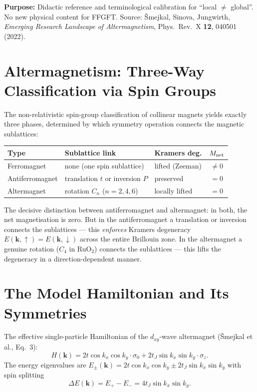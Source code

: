 \textbf{Purpose:} Didactic reference and terminological calibration
for \enquote{local $\neq$ global}. No new physical content for FFGFT.
Source: Šmejkal, Sinova, Jungwirth,
\textit{Emerging Research Landscape of Altermagnetism},
Phys.\ Rev.\ X \textbf{12}, 040501 (2022).

\section{Altermagnetism: Three-Way Classification via Spin Groups \E}

The non-relativistic spin-group classification of collinear magnets
yields exactly three phases, determined by which symmetry operation
connects the magnetic sublattices:

\begin{center}
\begin{tabular}{lllc}
\toprule
\textbf{Type} & \textbf{Sublattice link} & \textbf{Kramers deg.} & $M_{\rm net}$\\
\midrule
Ferromagnet     & none (one spin sublattice)         & lifted (Zeeman)   & $\neq 0$\\
Antiferromagnet & translation $t$ or inversion $P$   & preserved         & $= 0$\\
Altermagnet     & rotation $C_n$ ($n=2,4,6$)         & locally lifted    & $= 0$\\
\bottomrule
\end{tabular}
\end{center}

The decisive distinction between antiferromagnet and altermagnet: in
both, the net magnetisation is zero. But in the antiferromagnet a
translation or inversion connects the sublattices — this
\emph{enforces} Kramers degeneracy
$E(\mathbf{k},\uparrow) = E(\mathbf{k},\downarrow)$ across the entire
Brillouin zone. In the altermagnet a genuine rotation ($C_4$ in RuO$_2$)
connects the sublattices — this lifts the degeneracy in a
direction-dependent manner.

\section{The Model Hamiltonian and Its Symmetries \E}

The effective single-particle Hamiltonian of the $d_{xy}$-wave
altermagnet (Šmejkal et al., Eq.\ 3):
\begin{equation}
  H(\mathbf{k}) = 2t\cos k_x \cos k_y \cdot \sigma_0
    + 2t_J \sin k_x \sin k_y \cdot \sigma_z.
  \label{eq:alt_ham}
\end{equation}
The energy eigenvalues are
$E_\pm(\mathbf{k}) = 2t\cos k_x \cos k_y \pm 2t_J \sin k_x \sin k_y$
with spin splitting
\begin{equation}
  \Delta E(\mathbf{k}) = E_+ - E_- = 4t_J \sin k_x \sin k_y.
  \label{eq:splitting}
\end{equation}

